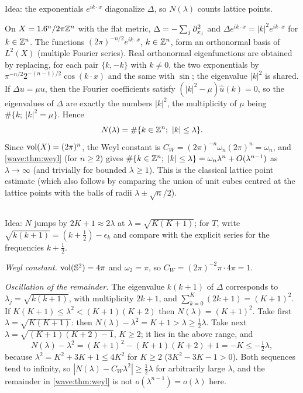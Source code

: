 \subsection*{}
Idea: the exponentials $e^{ik\cdot x}$ diagonalize $\Delta$, so $N(\lambda)$ counts lattice points.

On $X=1.6^n/2\pi\mathbb{Z}^n$ with the flat metric, $\Delta=-\sum_j\partial_{x_j}^2$ and
$\Delta e^{ik\cdot x}=|k|^2e^{ik\cdot x}$ for $k\in\mathbb{Z}^n$. The functions $(2\pi)^{-n/2}e^{ik\cdot x}$, $k\in\mathbb{Z}^n$,
form an orthonormal basis of $L^2(X)$ (multiple Fourier series). Real orthonormal eigenfunctions are
obtained by replacing, for each pair $\{k,-k\}$ with $k\neq0$, the two exponentials by
$\pi^{-n/2}2^{-(n-1)/2}\cos(k\cdot x)$ and the same with $\sin$; the eigenvalue $|k|^2$ is shared. If
$\Delta u=\mu u$, then the Fourier coefficients satisfy $(|k|^2-\mu)\hat u(k)=0$, so the eigenvalues of $\Delta$
are exactly the numbers $|k|^2$, the multiplicity of $\mu$ being $\#\{k;\ |k|^2=\mu\}$. Hence
\begin{equation*}
  N(\lambda)=\#\{k\in\Z^n;\ |k|\le\lambda\}.
\end{equation*}
Since $\operatorname{vol}(X)=(2\pi)^n$, the Weyl constant is $C_W=(2\pi)^{-n}\omega_n(2\pi)^n=\omega_n$, and
\cref{wave:thm:weyl} (for $n\ge2$) gives
$\#\{k\in\Z^n;\ |k|\le\lambda\}=\omega_n\lambda^n+O(\lambda^{n-1})$ as $\lambda\to\infty$ (and trivially for
bounded $\lambda\ge1$). This is the classical lattice point estimate (which also follows by comparing the
union of unit cubes centred at the lattice points with the balls of radii $\lambda\pm\sqrt n/2$).

\subsection*{}
Idea: $N$ jumps by $2K+1\approx2\lambda$ at $\lambda=\sqrt{K(K+1)}$; for $T$, write
$\sqrt{k(k+1)}=(k+\frac12)-\epsilon_k$ and compare with the explicit series for the frequencies $k+\frac12$.

\emph{Weyl constant.} $\operatorname{vol}(\mathbb{S}^2)=4\pi$ and $\omega_2=\pi$, so $C_W=(2\pi)^{-2}\pi\cdot4\pi=1$.

\emph{Oscillation of the remainder.} The eigenvalue $k(k+1)$ of $\Delta$ corresponds to
$\lambda_j=\sqrt{k(k+1)}$, with multiplicity $2k+1$, and $\sum_{k=0}^K(2k+1)=(K+1)^2$. If
$K(K+1)\le\lambda^2<(K+1)(K+2)$ then $N(\lambda)=(K+1)^2$. Take first $\lambda=\sqrt{K(K+1)}$: then
$N(\lambda)-\lambda^2=K+1>\lambda\ge\frac12\lambda$. Take next $\lambda=\sqrt{(K+1)(K+2)-1}$, $K\ge2$; it lies
in the above range, and
\begin{equation*}
  N(\lambda)-\lambda^2=(K+1)^2-(K+1)(K+2)+1=-K\le-\tfrac12\lambda,
\end{equation*}
because $\lambda^2=K^2+3K+1\le4K^2$ for $K\ge2$ ($3K^2-3K-1>0$). Both sequences tend to infinity, so
$|N(\lambda)-C_W\lambda^2|\ge\frac12\lambda$ for arbitrarily large $\lambda$, and the remainder in
\cref{wave:thm:weyl} is not $o(\lambda^{n-1})=o(\lambda)$ here.

